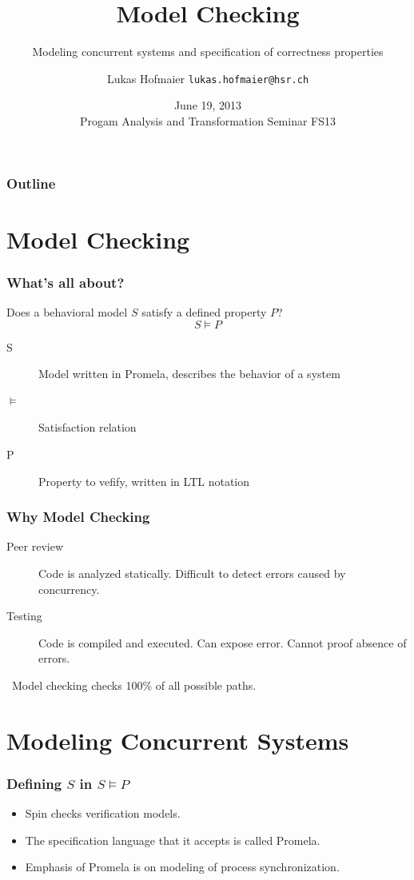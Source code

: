 \documentclass{beamer}
\title{Model Checking}
\subtitle{Modeling concurrent systems and specification of correctness properties}
\author{Lukas Hofmaier \texttt{lukas.hofmaier@hsr.ch}}
\date{June 19, 2013 \\ Progam Analysis and Transformation Seminar FS13}
\begin{document}
\maketitle
\begin{frame}
  \frametitle{Outline}
  \tableofcontents
\end{frame}

\section{Model Checking}

\begin{frame}
  \frametitle{What's all about?}
  Does a behavioral model $S$ satisfy a defined property $P$?
  \[
  S \models P
  \]
  \begin{description}
  \item[S] Model written in Promela, describes the behavior of a system
  \item[$\models$] Satisfaction relation
  \item[P] Property to vefify, written in LTL notation
  \end{description}
\end{frame}

\begin{frame}
  \frametitle{Why Model Checking}
  \begin{description}
  \item[Peer review] Code is analyzed statically. Difficult to detect errors caused by concurrency.
  \item[Testing] Code is compiled and executed. Can expose error. Cannot proof absence of errors.
  \end{description}\
Model checking checks 100\% of all possible paths.
\end{frame}

\section{Modeling Concurrent Systems}

\begin{frame}
  \frametitle{  Defining $S$ in $S \models P$}

  \begin{itemize}
  \item   Spin checks verification models.
  \item The specification language that it accepts is called Promela.
  \item Emphasis of Promela is on modeling of process synchronization.
  \end{itemize}
\end{frame}
\end{document}
